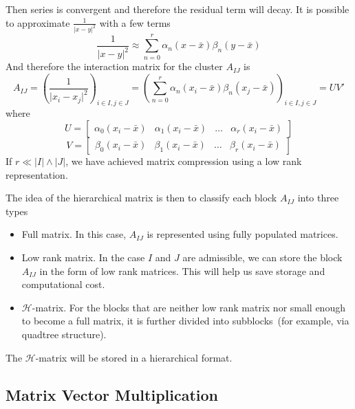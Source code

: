 \documentclass[10pt,a4paper]{article}
\theoremstyle{definition}
\begin{document}
Then series is convergent and therefore the residual term will decay. It is possible to approximate $\frac{1}{{|x - y{|^2}}}$ with a few terms
\begin{equation}
	\frac{1}{{|x - y{|^2}}} \approx \sum_{n=0}^r \alpha_n(x-\bar x)\beta_n(y-\bar x)
\end{equation}
And therefore the interaction matrix for the cluster $A_{IJ}$ is 
\begin{equation}
	A_{IJ} = \left(\frac{1}{{|x_i - x_j{|^2}}}\right)_{i\in I, j\in J} =\left( \sum_{n=0}^r \alpha_n(x_i-\bar x)\beta_n(x_j-\bar x)\right)_{i\in I, j\in J} = UV'
\end{equation}
where
\begin{equation}
	U = \begin{bmatrix}
		\alpha_0(x_i-\bar x)& \alpha_1(x_i-\bar x)&\ldots & \alpha_r(x_i-\bar x)
	\end{bmatrix}
\end{equation}
\begin{equation}
	V = \begin{bmatrix}
		\beta_0(x_i-\bar x)& \beta_1(x_i-\bar x)&\ldots & \beta_r(x_i-\bar x)
	\end{bmatrix}
\end{equation}
If $r\ll |I|\wedge |J|$, we have achieved matrix compression using a low rank representation. 

The idea of the hierarchical matrix is then to classify each block $A_{IJ}$ into three types
\begin{itemize}
\item Full matrix. In this case, $A_{IJ}$ is represented using fully populated matrices.
\item Low rank matrix. In the case $I$ and $J$ are admissible, we can store the block $A_{IJ}$ in the form of low rank matrices. This will help us save storage and computational cost.
	\item $\mathcal{H}$-matrix. For the blocks that are neither low rank matrix nor small enough to become a full matrix, it is further divided into subblocks~(for example, via quadtree structure). 
\end{itemize}

The $\mathcal{H}$-matrix will be stored in a hierarchical format. 


\subsection{Matrix Vector Multiplication}
\end{document}
